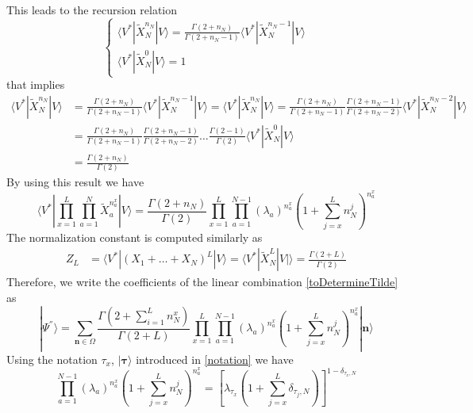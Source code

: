 \documentclass[10pt]{article}
\numberwithin{equation}{section}
\numberwithin{equation}{subsection}
\begin{document}
This leads to the recursion relation
\begin{equation}
	\begin{cases}
		\langle V^{*}|\widetilde{X}_{N}^{n_{N}}|V\rangle=\frac{\Gamma(2+n_{N})}{\Gamma(2+n_{N}-1)}\langle V^{*}|\widetilde{X}_{N}^{n_{N}-1}|V\rangle\\
		\langle V^{*}|\widetilde{X}_{N}^{0}|V\rangle=1
	\end{cases}
\end{equation}
that implies 
\begin{align*}
	\langle V^{*}|\widetilde{X}_{N}^{n_{N}}|V\rangle&=\frac{\Gamma(2+n_{N})}{\Gamma(2+n_{N}-1)}\langle V^{*}|\widetilde{X}_{N}^{n_{N}-1}|V\rangle=\langle V^{*}|\widetilde{X}_{N}^{n_{N}}|V\rangle=\frac{\Gamma(2+n_{N})}{\Gamma(2+n_{N}-1)}\frac{\Gamma(2+n_{N}-1)}{\Gamma(2+n_{N}-2)}\langle V^{*}|\widetilde{X}_{N}^{n_{N}-2}|V\rangle\\&=
	\frac{\Gamma(2+n_{N})}{\Gamma(2+n_{N}-1)}\frac{\Gamma(2+n_{N}-1)}{\Gamma(2+n_{N}-2)}\ldots \frac{\Gamma(2-1)}{\Gamma(2)}\langle V^{*}|\widetilde{X}_{N}^{0}|V\rangle
	\\&=
	\frac{\Gamma(2+n_{N})}{\Gamma(2)}
\end{align*}
By using this result we have 
\begin{equation}
	\langle V^{*}|\prod_{x=1}^{L}\prod_{a=1}^{N}\widetilde{X}_{a}^{n_{a}^{x}}
	|V \rangle=\frac{\Gamma(2+n_{N})}{\Gamma(2)}\prod_{x=1}^{L}\prod_{a=1}^{N-1}\left(\lambda_{a}\right)^{n_{a}^{x}}\left(1+\sum_{j=x}^{L}n_{N}^{j}\right)^{n_{a}^{x}}
\end{equation}
The normalization constant is computed similarly as 
\begin{align*}
	Z_{L}&=\langle V^{*}|(X_{1}+\ldots+X_{N})^{L}|V\rangle=\langle V^{*}|\widetilde{X}_{N}^{L}|V|\rangle=
	\frac{\Gamma(2+L)}{\Gamma(2)}
\end{align*}
Therefore, we write the coefficients of the linear combination \eqref{toDetermineTilde} as 
\begin{equation}\label{resulEsteady}
	|\Psi^{''}\rangle= \sum_{\bm{n}\in \Omega}\frac{\Gamma(2+\sum_{i=1}^{L}n_{N}^{x})}{\Gamma(2+L)}\prod_{x=1}^{L}\prod_{a=1}^{N-1}\left(\lambda_{a}\right)^{n_{a}^{x}}\left(1+\sum_{j=x}^{L}n_{N}^{j}\right)^{n_{a}^{x}}|\bm{n}\rangle
\end{equation}
Using the notation $\tau_{x}$, $|\bm{\tau}\rangle $ introduced in \eqref{notation} we have 
\begin{equation}
	\prod_{a=1}^{N-1}\left(\lambda_{a}\right)^{n_{a}^{x}}\left(1+\sum_{j=x}^{L}n_{N}^{j}\right)^{n_{a}^{x}}=\left[\lambda_{\tau_{x}}\left(1+\sum_{j=x}^{L}\delta_{\tau_{j},N}\right)\right]^{1-\delta_{\tau_{x},N}}
\end{equation}
\end{document}
